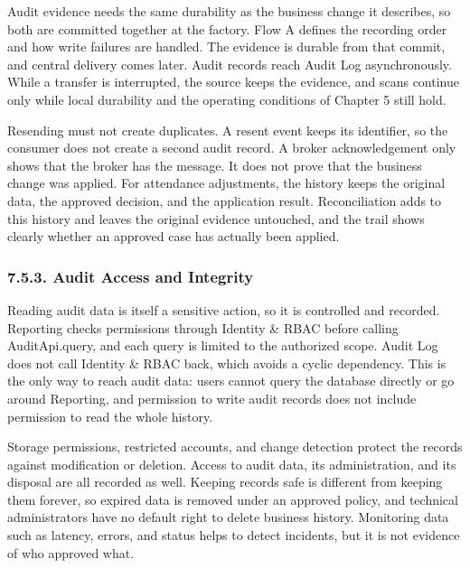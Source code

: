 {}

Audit evidence needs the same durability as the business change it describes, so both are committed together at the factory. Flow A defines the recording order and how write failures are handled. The evidence is durable from that commit, and central delivery comes later. Audit records reach Audit Log asynchronously. While a transfer is interrupted, the source keeps the evidence, and scans continue only while local durability and the operating conditions of Chapter 5 still hold.

Resending must not create duplicates. A resent event keeps its identifier, so the consumer does not create a second audit record. A broker acknowledgement only shows that the broker has the message. It does not prove that the business change was applied. For attendance adjustments, the history keeps the original data, the approved decision, and the application result. Reconciliation adds to this history and leaves the original evidence untouched, and the trail shows clearly whether an approved case has actually been applied.

\subsubsection*{7.5.3. Audit Access and Integrity}

{}

Reading audit data is itself a sensitive action, so it is controlled and recorded. Reporting checks permissions through Identity \& RBAC before calling AuditApi.query, and each query is limited to the authorized scope. Audit Log does not call Identity \& RBAC back, which avoids a cyclic dependency. This is the only way to reach audit data: users cannot query the database directly or go around Reporting, and permission to write audit records does not include permission to read the whole history.

Storage permissions, restricted accounts, and change detection protect the records against modification or deletion. Access to audit data, its administration, and its disposal are all recorded as well. Keeping records safe is different from keeping them forever, so expired data is removed under an approved policy, and technical administrators have no default right to delete business history. Monitoring data such as latency, errors, and status helps to detect incidents, but it is not evidence of who approved what.

